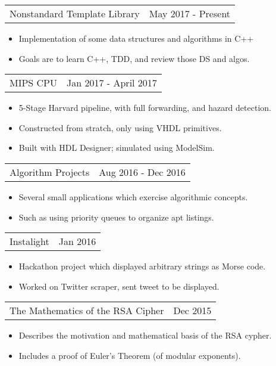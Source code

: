 \documentclass[18pt]{article}
\makeatletter
\providecommand{\tightlist}{
    \setlength{\itemsep}{0pt}\setlength{\parskip}{0pt}
}
\providecommand{\datetable}[2]{
    \begin{tabular*}{\textwidth}{r @{\extracolsep{\fill}} l}
        #1 & #2
    \end{tabular*}
}
\makeatother
\begin{document}
      \datetable{Nonstandard Template Library}{May 2017 - Present}
      \begin{itemize}\tightlist
        \item Implementation of some data structures and algorithms in C++
        \item Goals are to learn C++, TDD, and review those DS and algos.
      \end{itemize}
          
      \datetable{MIPS CPU}{Jan 2017 - April 2017}
      \begin{itemize}\tightlist
        \item 5-Stage Harvard pipeline, with full forwarding, and hazard detection.
        \item Constructed from stratch, only using VHDL primitives.
        \item Built with HDL Designer; simulated using ModelSim.
      \end{itemize}
      
      
      \datetable{Algorithm Projects}{Aug 2016 - Dec 2016}
      \begin{itemize}\tightlist
        \item Several small applications which exercise algorithmic concepts.
        \item Such as using priority queues to organize apt listings.
      \end{itemize}
        
      \datetable{Instalight}{Jan 2016}
      \begin{itemize}\tightlist
        \item Hackathon project which displayed arbitrary strings as Morse code.
        \item Worked on Twitter scraper, sent tweet to be displayed.
      \end{itemize}
      
      \datetable{The Mathematics of the RSA Cipher}{Dec 2015}
      \begin{itemize}\tightlist
        \item Describes the motivation and mathematical basis of the RSA cypher.
        \item Includes a proof of Euler's Theorem (of modular exponents).
      \end{itemize}
    
\end{document}
